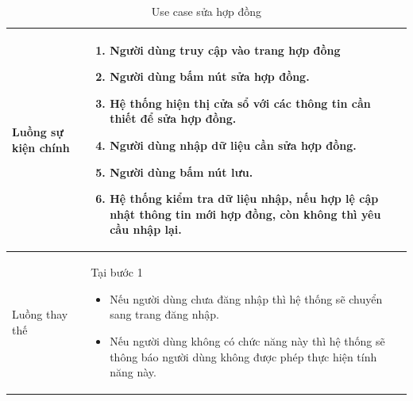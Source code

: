 \documentclass[12pt,a4paper]{article}
\begin{document}
\begin{table}[H]
\begin{tabular}{|p{3.5cm}|p{11.5cm}|c|}
            Luồng sự kiện chính & \vspace{-.8cm}\begin{enumerate}
                                                    \item Người dùng truy cập vào trang hợp đồng
                                                    \item  Người dùng bấm nút sửa hợp đồng.
                                                    \item  Hệ thống hiện thị cửa sổ với các thông tin cần thiết để sửa hợp đồng.
                                                    \item  Người dùng nhập dữ liệu cần sửa hợp đồng.
                                                    \item Người dùng bấm nút lưu.
                                                    \item Hệ thống kiểm tra dữ liệu nhập, nếu hợp lệ cập nhật thông tin mới hợp đồng, còn không thì yêu cầu nhập lại.
            \end{enumerate}
            \\
            \hline
            Luồng thay thế & Tại bước 1\newline
            \vspace{-.8cm}\begin{itemize}
                              \item Nếu người dùng chưa đăng nhập thì hệ thống sẽ chuyển sang trang đăng nhập.
                              \item  Nếu người dùng không có chức năng này thì hệ thống sẽ thông báo người dùng không được phép thực hiện tính năng này.
            \end{itemize}
            \\
            \hline
        \end{tabular}
        \caption{Use case sửa hợp đồng }
    \end{table}


\end{document}
